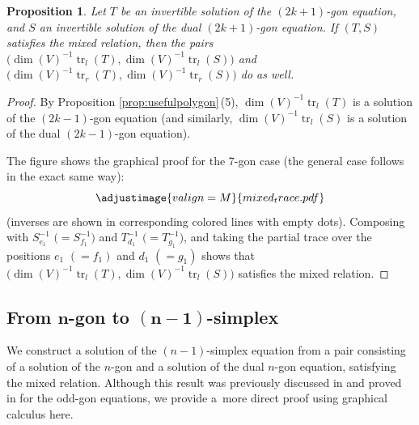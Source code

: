 \documentclass[10pt,a4paper]{amsart}
\numberwithin{equation}{section}
\newtheorem{Proposition}[Theorem]{Proposition}
\theoremstyle{definition}
\begin{document}
\begin{Proposition}
 Let $T$ be an invertible solution of the $(2k+1)$-gon equation, and $S$ an invertible solution of the dual $(2k+1)$-gon equation. If $(T,S)$ satisfies the mixed relation, then the pairs
 $\bigl(\operatorname{dim}(V)^{-1}\operatorname{tr}_l(T),\allowbreak\operatorname{dim}(V)^{-1}\operatorname{tr}_l(S)\bigr)$ and $\bigl(\operatorname{dim}(V)^{-1}\operatorname{tr}_r(T), \operatorname{dim}(V)^{-1}\operatorname{tr}_r(S)\bigr)$ do as well.
\end{Proposition}

\begin{proof}
 By Proposition \ref{prop:usefulpolygon}\,(5), $\operatorname{dim}(V)^{-1}\operatorname{tr}_l(T)$ is a solution of the $(2k-1)$-gon equation (and similarly, $\operatorname{dim}(V)^{-1}\operatorname{tr}_l(S)$ is a solution of the dual $(2k-1)$-gon equation).

 The figure shows the graphical proof for the 7-gon case (the general case follows in the exact same way):
 \begin{equation*}
 \adjustimage{valign=M}{mixed_trace.pdf}
 \end{equation*}
 (inverses are shown in corresponding colored lines with empty dots). Composing with $S_{e_1}^{-1}$ $\bigl(=S_{f_1}^{-1}\bigr)$ and $T_{d_1}^{-1}$ $\bigl(=T_{g_1}^{-1}\bigr)$, and taking the partial trace over the positions $e_1$ $(=f_1)$ and $d_1$ $(=g_1)$ shows that $\bigl(\operatorname{dim}(V)^{-1}\operatorname{tr}_l(T), \operatorname{dim}(V)^{-1}\operatorname{tr}_l(S)\bigr)$ satisfies the mixed relation.
\end{proof}

\subsection[From n-gon to (n-1)-simplex]{From $\boldsymbol{n}$-gon to $\boldsymbol{(n-1)}$-simplex}
We construct a solution of the $(n-1)$-simplex equation from a pair consisting of a solution of the $n$-gon and a solution of the dual $n$-gon equation, satisfying the mixed relation. Although this result was previously discussed in \cite{dimakis2015simplex} and proved in \cite{dimakis2021grassmannian} for the odd-gon equations, we provide a~more direct proof using graphical calculus here.
\end{document}
